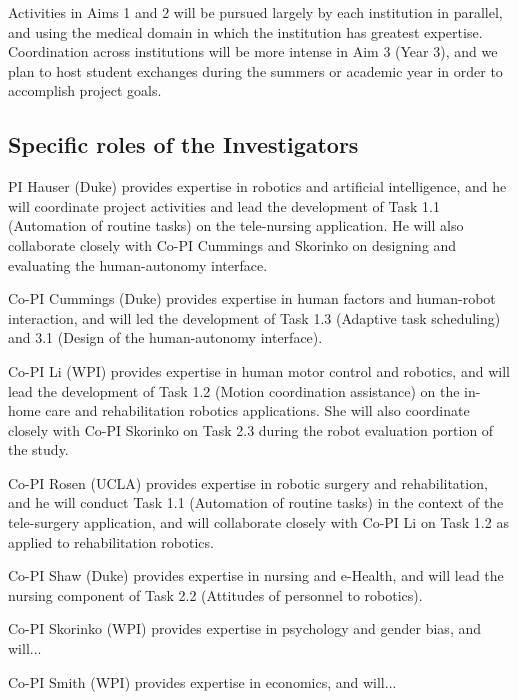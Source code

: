 Activities in Aims 1 and 2 will be pursued largely by each institution in parallel, and using the medical domain in which the institution has greatest expertise. Coordination across institutions will be more intense in Aim 3 (Year 3), and we plan to host student exchanges during the summers or academic year in order to accomplish project goals.

\subsection{Specific roles of the Investigators}

PI Hauser (Duke) provides expertise in robotics and artificial intelligence, and he will coordinate project activities and lead the development of Task 1.1 (Automation of routine tasks) on the tele-nursing application.  He will also collaborate closely with Co-PI Cummings and Skorinko on designing and evaluating the human-autonomy interface.

Co-PI Cummings (Duke) provides expertise in human factors and human-robot interaction, and will led the development of Task 1.3 (Adaptive task scheduling) and 3.1 (Design of the human-autonomy interface).

Co-PI Li (WPI) provides expertise in human motor control and robotics, and will lead the development of Task 1.2 (Motion coordination assistance) on the in-home care and rehabilitation robotics applications.  She will also coordinate closely with Co-PI Skorinko on Task 2.3 during the robot evaluation portion of the study.

Co-PI Rosen (UCLA) provides expertise in robotic surgery and rehabilitation, and he will conduct Task 1.1 (Automation of routine tasks) in the context of the tele-surgery application, and will collaborate closely with Co-PI Li on Task 1.2 as applied to rehabilitation robotics.  

Co-PI Shaw (Duke) provides expertise in nursing and e-Health, and will lead the nursing component of Task 2.2 (Attitudes of personnel to robotics).

Co-PI Skorinko (WPI) provides expertise in psychology and gender bias, and will...

Co-PI Smith (WPI) provides expertise in economics, and will...
